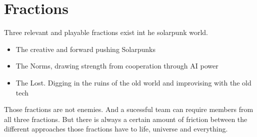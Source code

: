 \chapter{Fractions}

Three relevant and playable fractions exist int he solarpunk world.

\begin{itemize}
    \item The creative and forward pushing Solarpunks
    \item The Norms, drawing strength from cooperation through AI power
    \item The Lost. Digging in the ruins of the old world and improvising with the old tech
\end{itemize}

Those fractions are not enemies. And a sucessful team can require members from all three fractions. But there is always a certain amount of friction between the different approaches those fractions have to life, universe and everything.